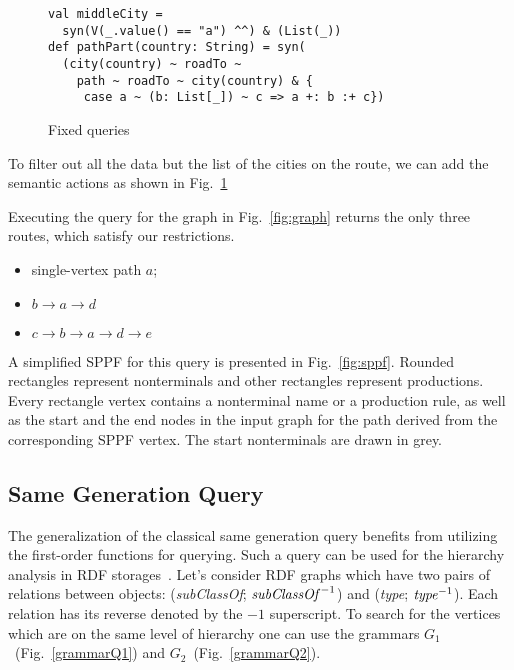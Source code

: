 \begin{figure}[h]
\begin{lstlisting}
val middleCity =
  syn(V(_.value() == "a") ^^) & (List(_))
def pathPart(country: String) = syn(
  (city(country) ~ roadTo ~
    path ~ roadTo ~ city(country) & {
     case a ~ (b: List[_]) ~ c => a +: b :+ c})
\end{lstlisting}
\caption{Fixed queries}
\label{fig:fixedPathQ}
\end{figure}

To filter out all the data but the list of the cities on the route, we can add the semantic actions as shown in Fig.~\ref{fig:fixedPathQ}


Executing the query for the graph in Fig.~\ref{fig:graph} returns the only three routes, which satisfy our restrictions.

\begin{itemize}
\item single-vertex path $a$;
\item $b \rightarrow a \rightarrow d$
\item $c \rightarrow b \rightarrow a \rightarrow d \rightarrow e$
\end{itemize}

A simplified SPPF for this query is presented in Fig.~\ref{fig:sppf}. Rounded rectangles represent nonterminals and other rectangles represent productions.
Every rectangle vertex contains a nonterminal name or a production rule, as well as the start and the end nodes in the input graph for the path derived from the corresponding SPPF vertex.
The start nonterminals are drawn in grey.

\subsection{Same Generation Query}

The generalization of the classical same generation query benefits from utilizing the first-order functions for querying.
Such a query can be used for the hierarchy analysis in RDF storages~\cite{CFGonRDF}.
Let's consider RDF graphs which have two pairs of relations between objects: (\emph{subClassOf}; $\text{\emph{subClassOf}}^{-1}$) and (\emph{type}; $\text{\emph{type}}^{-1}$). Each relation has its reverse denoted by the $-1$ superscript.
To search for the vertices which are on the same level of hierarchy one can use the grammars $G_1$~(Fig.~\ref{grammarQ1}) and $G_2$~(Fig.~\ref{grammarQ2}).

